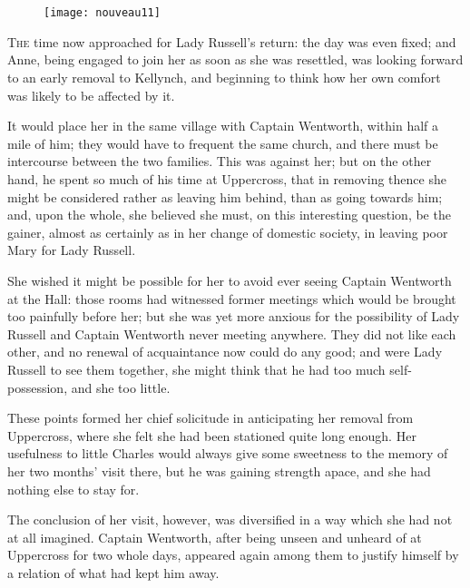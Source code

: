 \chapter[Chapter \thechapter]{}

\begin{figure}[t!]
\centering
\texttt{[image: nouveau11]}
\end{figure}

\lettrine[lines=4,lraise=0.3]{T}{he} time now approached for Lady Russell's return: the day was even fixed; and Anne, being engaged to join her as soon as she was resettled, was looking forward to an early removal to Kellynch, and beginning to think how her own comfort was likely to be affected by it.

It would place her in the same village with Captain Wentworth, within half a mile of him; they would have to frequent the same church, and there must be intercourse between the two families. This was against her; but on the other hand, he spent so much of his time at Uppercross, that in removing thence she might be considered rather as leaving him behind, than as going towards him; and, upon the whole, she believed she must, on this interesting question, be the gainer, almost as certainly as in her change of domestic society, in leaving poor Mary for Lady Russell.

She wished it might be possible for her to avoid ever seeing Captain Wentworth at the Hall: those rooms had witnessed former meetings which would be brought too painfully before her; but she was yet more anxious for the possibility of Lady Russell and Captain Wentworth never meeting anywhere. They did not like each other, and no renewal of acquaintance now could do any good; and were Lady Russell to see them together, she might think that he had too much self-possession, and she too little.

These points formed her chief solicitude in anticipating her removal from Uppercross, where she felt she had been stationed quite long enough. Her usefulness to little Charles would always give some sweetness to the memory of her two months' visit there, but he was gaining strength apace, and she had nothing else to stay for.

The conclusion of her visit, however, was diversified in a way which she had not at all imagined. Captain Wentworth, after being unseen and unheard of at Uppercross for two whole days, appeared again among them to justify himself by a relation of what had kept him away.

